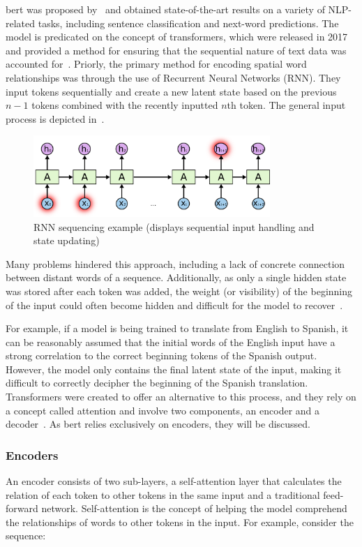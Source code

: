 \acrshort{bert} was proposed by~\textcite{devlin2019bert:} and obtained state-of-the-art results on a variety of NLP-related tasks, including sentence classification and next-word predictions. The model is predicated on the concept of transformers, which were released in 2017 and provided a method for ensuring that the sequential nature of text data was accounted for~\parencite{transformers:}. Priorly, the primary method for encoding spatial word relationships was through the use of Recurrent Neural Networks (RNN). They input tokens sequentially and create a new latent state based on the previous $n-1$ tokens combined with the recently inputted $n$th token. The general input process is depicted in~.

\begin{figure}[h]
\centering
\includegraphics[width=0.8\textwidth]{fig/rnn.png}
\caption{RNN sequencing example (displays sequential input handling and state updating)~\parencite{olah_2015}}
\label{fig:rnn}
\end{figure}

Many problems hindered this approach, including a lack of concrete connection between distant words of a sequence. Additionally, as only a single hidden state was stored after each token was added, the weight (or visibility) of the beginning of the input could often become hidden and difficult for the model to recover~\parencite{hochreiter1997long}. 

For example, if a model is being trained to translate from English to Spanish, it can be reasonably assumed that the initial words of the English input have a strong correlation to the correct beginning tokens of the Spanish output. However, the model only contains the final latent state of the input, making it difficult to correctly decipher the beginning of the Spanish translation. Transformers were created to offer an alternative to this process, and they rely on a concept called attention and involve two components, an encoder and a decoder~\parencite{transformers:}. As \acrshort{bert} relies exclusively on encoders, they will be discussed.

\subsubsection{Encoders}
An encoder consists of two sub-layers, a self-attention layer that calculates the relation of each token to other tokens in the same input and a traditional feed-forward network. Self-attention is the concept of helping the model comprehend the relationships of words to other tokens in the input. For example, consider the sequence: \\

